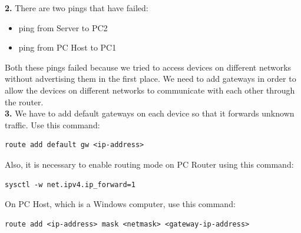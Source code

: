 \documentclass[12pt]{extarticle}
\begin{document}
\textbf{2.} There are two pings that have failed:
\begin{itemize}
\item ping from Server to PC2
\item ping from PC Host to PC1
\end{itemize}
Both these pings failed because we tried to access devices on different networks without advertising them in the first place. We need to add gateways in order to allow the devices on different networks to communicate with each other through the router.\\

\textbf{3.} We have to add default gateways on each device so that it forwards unknown traffic. Use this command:
\begin{verbatim}
route add default gw <ip-address>
\end{verbatim}
Also, it is necessary to enable routing mode on PC Router using this command:
\begin{verbatim}
sysctl -w net.ipv4.ip_forward=1
\end{verbatim}
On PC Host, which is a Windows computer, use this command:
\begin{verbatim}
route add <ip-address> mask <netmask> <gateway-ip-address>
\end{verbatim}
\end{document}
